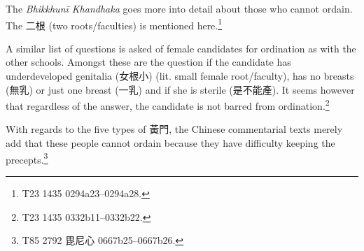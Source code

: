 The {\em Bhikkhunī Khandhaka} goes more into detail about those who cannot ordain. The 二根 (two roots/faculties) is mentioned here.\footnote{T23 1435 0294a23–0294a28.} 

A similar list of questions is asked of female candidates for ordination as with the other schools. Amongst these are the question if the candidate has underdeveloped genitalia (女根小) (lit. small female root/faculty), has no breasts (無乳) or just one breast (一乳) and if she is sterile (是不能產). It seems however that regardless of the answer, the candidate is not barred from ordination.\footnote{T23 1435 0332b11–0332b22.}

With regards to the five types of 黃門, the Chinese commentarial texts merely add that these people cannot ordain because they have difficulty keeping the precepts.\footnote{T85 2792 毘尼心 0667b25–0667b26.}
